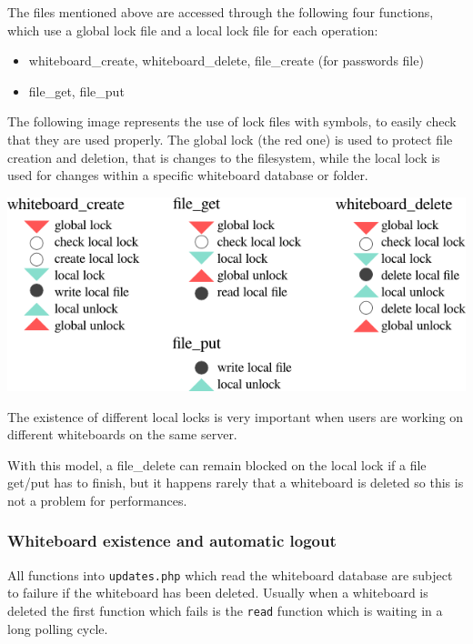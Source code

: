 \documentclass[10pt,a4paper,english]{book}
\begin{document}
The files mentioned above are accessed through the following four
functions, which use a global lock file and a local lock file for each
operation:
\begin{itemize}
\item {} 
whiteboard{\_}create, whiteboard{\_}delete, file{\_}create (for passwords file)

\item {} 
file{\_}get, file{\_}put

\end{itemize}

The following image represents the use of lock files with symbols, to
easily check that they are used properly. The global lock (the red
one) is used to protect file creation and deletion, that is changes to
the filesystem, while the local lock is used for changes within a
specific whiteboard database or folder.

\includegraphics{images/server_concurrency.png}

The existence of different local locks is very important when users
are working on different whiteboards on the same server.

With this model, a file{\_}delete can remain blocked on the local lock if
a file get/put has to finish, but it happens rarely that a whiteboard
is deleted so this is not a problem for performances.



\hypertarget{whiteboard-existence-and-automatic-logout}{}
\subsubsection{Whiteboard existence and automatic logout}
\label{whiteboard-existence-and-automatic-logout}

All functions into \texttt{updates.php} which read the whiteboard database
are subject to failure if the whiteboard has been deleted. Usually
when a whiteboard is deleted the first function which fails is the
\texttt{read} function which is waiting in a long polling cycle.
\end{document}
